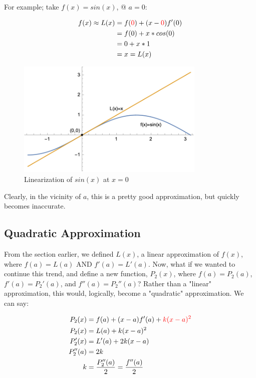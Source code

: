 \documentclass[12pt]{article}
\begin{document}
For example; take $f(x) = sin(x)$, @ $a=0$:

\begin{equation}
    \begin{split}
        f(x) \approx L(x) &= f(\textcolor{red}{0}) + (x-\textcolor{red}{0})f'(0)\\
        &= f(0) + x*cos(0)\\
        &= 0 + x*1\\
        &= x = L(x)
    \end{split}
\end{equation}

\begin{figure}
    \centering
    \includegraphics[width=9cm]{misc/linearizationofsinx.png}
    \caption{Linearization of $sin(x)$ at $x=0$}
\end{figure}

Clearly, in the vicinity of $a$, this is a pretty good approximation, but quickly becomes inaccurate.

\subsection{Quadratic Approximation}
From the section earlier, we defined $L(x)$, a linear approximation of $f(x)$, where $f(a) = L(a)$ AND $f'(a) = L'(a)$. Now, what if we wanted to continue this trend, and define a new function, $P_2(x)$, where $f(a) = P_2(a)$, $f'(a) = P_2'(a)$, and $f''(a) = P_2''(a)$? Rather than a "linear" approximation, this would, logically, become a "quadratic" approximation. We can say:

\begin{equation}
    \begin{split}
    P_2(x) &= f(a) + (x-a)f'(a) + \textcolor{red}{k(x-a)^2}\\
    P_2(x) &= L(a) + k(x-a)^2\\
    P_2'(x) &= L'(a) + 2k(x-a)\\
    P_2''(a) &= 2k\\
    k &= \frac{P_2''(a)}{2} = \frac{f''(a)}{2}
    \end{split}
\end{equation}
\end{document}
